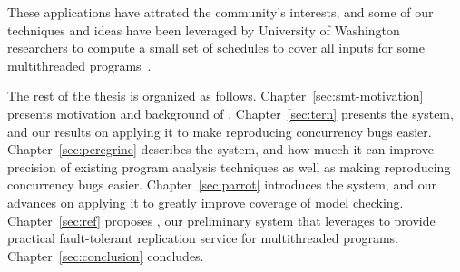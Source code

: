 These \smt applications have attrated the community's interests, and
some of our \smt techniques and ideas have been leveraged by University of
Washington researchers to compute a small set of schedules to cover all inputs
for some multithreaded programs~\cite{bergan:oopsla13}.

The rest of the thesis is organized as follows. Chapter~\ref{sec:smt-motivation}
presents motivation and background of \smt. Chapter~\ref{sec:tern} presents
the \tern system, and our results on applying it to make reproducing concurrency
bugs easier. Chapter~\ref{sec:peregrine} describes the \peregrine system, and
how mucch it can improve precision of existing program analysis techniques as
well as making reproducing concurrency bugs easier. Chapter~\ref{sec:parrot}
introduces the \parrot system, and our advances on applying it to greatly
improve coverage of model checking. Chapter~\ref{sec:ref} proposes \crane, our
preliminary system that leverages \smt to provide practical fault-tolerant
replication service for multithreaded programs. Chapter~\ref{sec:conclusion}
concludes.



